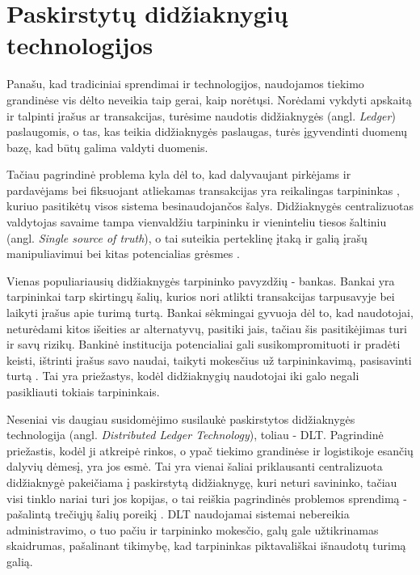
\section {Paskirstytų didžiaknygių technologijos}

Panašu, kad tradiciniai sprendimai ir technologijos, naudojamos tiekimo grandinėse vis dėlto neveikia taip gerai, kaip norėtųsi.
Norėdami vykdyti apskaitą ir talpinti įrašus ar transakcijas, turėsime naudotis didžiaknygės (angl. \textit{Ledger}) paslaugomis, o tas, kas teikia didžiaknygės paslaugas, turės įgyvendinti duomenų bazę, kad būtų galima valdyti duomenis.

Tačiau pagrindinė problema kyla dėl to, kad dalyvaujant pirkėjams ir pardavėjams bei fiksuojant atliekamas transakcijas yra reikalingas tarpininkas \cite{gao2018coc}, kuriuo pasitikėtų visos sistema besinaudojančos šalys. Didžiaknygės centralizuotas valdytojas savaime tampa vienvaldžiu tarpininku ir vieninteliu tiesos šaltiniu (angl. \textit{Single source of truth}), o tai suteikia perteklinę įtaką ir galią įrašų manipuliavimui bei kitas potencialias grėsmes \cite{jiang2017much} \cite{shyamasundar2018blockchain}. 

Vienas populiariausių didžiaknygės tarpininko pavyzdžių - bankas. Bankai yra tarpininkai tarp skirtingų šalių, kurios nori atlikti transakcijas tarpusavyje bei laikyti įrašus apie turimą turtą. Bankai sėkmingai gyvuoja dėl to, kad naudotojai, neturėdami kitos išeities ar alternatyvų, pasitiki jais, tačiau šis pasitikėjimas turi ir savų rizikų. Bankinė institucija potencialiai gali susikompromituoti ir pradėti keisti, ištrinti įrašus savo naudai, taikyti mokesčius už tarpininkavimą, pasisavinti turtą \cite{shyamasundar2018blockchain}. Tai yra priežastys, kodėl didžiaknygių naudotojai iki galo negali pasikliauti tokiais tarpininkais.

Neseniai vis daugiau susidomėjimo susilaukė paskirstytos didžiaknygės technologija (angl. \textit{Distributed Ledger Technology}), toliau - DLT. Pagrindinė priežastis, kodėl ji atkreipė rinkos, o ypač tiekimo grandinėse ir logistikoje esančių dalyvių dėmesį, yra jos esmė. Tai yra vienai šaliai priklausanti centralizuota didžiaknygė pakeičiama į paskirstytą didžiaknygę, kuri neturi savininko, tačiau visi tinklo nariai turi jos kopijas, o tai reiškia pagrindinės problemos sprendimą - pašalintą trečiųjų šalių poreikį \cite{shyamasundar2018blockchain}. DLT naudojamai sistemai nebereikia administravimo, o tuo pačiu ir tarpininko mokesčio, galų gale užtikrinamas skaidrumas, pašalinant tikimybę, kad tarpininkas piktavališkai išnaudotų turimą galią.



